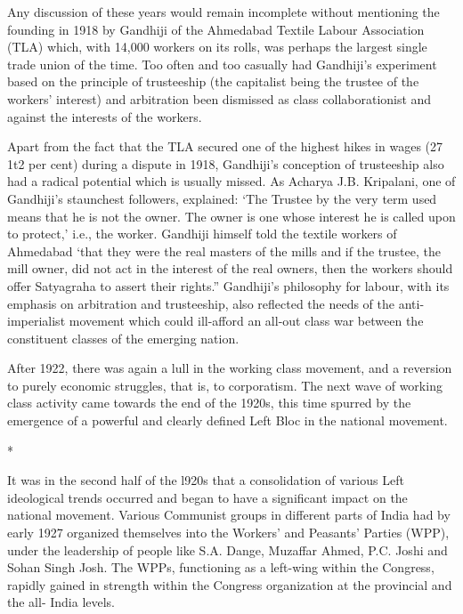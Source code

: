 Any discussion of these years would remain incomplete without mentioning the founding in 1918 by Gandhiji of the Ahmedabad Textile Labour Association (TLA) which, with 14,000 workers on its rolls, was perhaps the largest single trade union of the time. Too often and too casually had Gandhiji’s experiment based on the principle of trusteeship (the capitalist being the trustee of the workers’ interest) and arbitration been dismissed as class collaborationist and against the interests of the workers.

Apart from the fact that the TLA secured one of the highest hikes in wages (27 1t2 per cent) during a dispute in 1918, Gandhiji’s conception of trusteeship also had a radical potential which is usually missed. As Acharya J.B. Kripalani, one of Gandhiji’s staunchest followers, explained: ‘The Trustee by the very term used means that he is not the owner. The owner is one whose interest he is called upon to protect,’ i.e., the worker. Gandhiji himself told the textile workers of Ahmedabad ‘that they were the real masters of the mills and if the trustee, the mill owner, did not act in the interest of the real owners, then the workers should offer Satyagraha to assert their rights.” Gandhiji’s philosophy for labour, with its emphasis on arbitration and trusteeship, also reflected the needs of the anti- imperialist movement which could ill-afford an all-out class war between the constituent classes of the emerging nation.

After 1922, there was again a lull in the working class movement, and a reversion to purely economic struggles, that is, to corporatism. The next wave of working class activity came towards the end of the 1920s, this time spurred by the emergence of a powerful and clearly defined Left Bloc in the national movement.

\begin{center}*\end{center}



It was in the second half of the l920s that a consolidation of various Left ideological trends occurred and began to have a significant impact on the national movement. Various Communist groups in different parts of India had by early 1927 organized themselves into the Workers’ and Peasants’ Parties (WPP), under the leadership of people like S.A. Dange, Muzaffar Ahmed, P.C. Joshi and Sohan Singh Josh. The WPPs, functioning as a left-wing within the Congress, rapidly gained in strength within the Congress organization at the provincial and the all- India levels.

